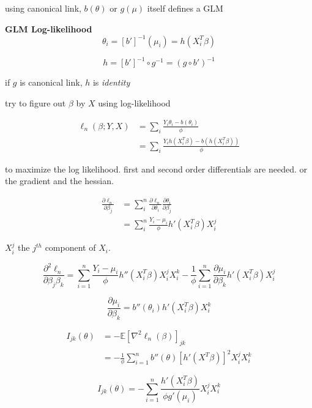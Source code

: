 \documentclass[12pt,a4paper]{article}
\begin{document}
using canonical link, $b(\theta)$ or $g(\mu)$ itself defines a GLM

\hspace{1cm}

\textbf{GLM Log-likelihood}
\[
	\theta_i = [b']^{-1}(\mu_i) = h(X_i^T\beta)
\]

\[
	h = [b']^{-1} \circ g^{-1} = (g \circ b')^{-1}
\]

if $g$ is canonical link, $h$ is \textit{identity}

try to figure out $\beta$ by $X$ using log-likelihood

\begin{align*}
	\ell_n(\beta;Y,X) & = \sum_i \frac{Y_i \theta_i - b(\theta_i) }{\phi} \\
	 & = \sum_i \frac{Y_i h(X_i^T\beta) - b(h(X_i^T\beta))}{\phi}
\end{align*}

to maximize the log likelihood. first and second order differentials are needed. or the gradient and the hessian.


\begin{align*}
	\frac{\partial \ell_n}{\partial \beta_j} & = \sum_i^n \frac{\partial \ell_n}{\partial \theta_i} \frac{\partial \theta_i}{\partial \beta_j}  \\
	& = \sum_i^n \frac{Y_i-\mu_i}{\phi} h'(X_i^T\beta)X_i^j
\end{align*}

$X_i^j$ the $j^{th}$ component of $X_i$.

\[
	\frac{\partial^2 \ell_n}{\partial \beta_j\beta_k}  = \sum_{i = 1}^{n} \frac{Y_i-\mu_i}{\phi} h''(X_i^T\beta)X_i^jX_i^k -\frac{1}{\phi}\sum_{i = 1}^{n} \frac{\partial \mu_i}{\partial \beta_k}h'(X_i^T\beta)X_i^j
\]

\[
	\frac{\partial \mu_i}{\partial \beta_k} = b''(\theta_i)h'(X_i^T\beta)X_i^k
\]


\begin{align*}
	I_{jk}(\theta) & = -\mathbb{E}\left[\nabla^2 \ell_n(\beta)\right]_{jk} \\
		& = -\frac{1}{\phi}\sum_{i = 1}^{n}  b''(\theta)[h'(X^T\beta)]^2X_i^jX_i^k
\end{align*}

\[
	I_{jk}(\theta) = -\sum_{i = 1}^{n}  \frac{h'(X_i^T\beta)}{\phi g'(\mu_i)} X_i^jX_i^k
\]

\begin{center}
\end{center}
\end{document}
